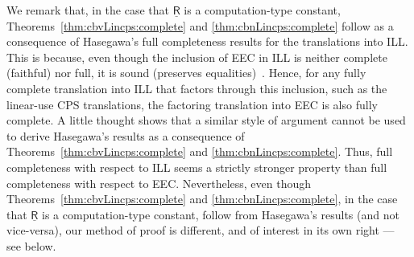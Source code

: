 \documentclass{LMCS}
\newcommand{\comptype}[1]{\underline{#1}}
\newcommand{\CR}{\comptype{\mathsf{R}}}
\begin{document}
We remark that, in the case that $\CR$ is a computation-type constant,
Theorems~\ref{thm:cbvLincps:complete} and \ref{thm:cbnLincps:complete} follow as a consequence of 
Hasegawa's full completeness results for the translations into ILL.
This is because, even though the inclusion of EEC in ILL is neither complete (faithful) nor full,
it is sound (preserves equalities)~\cite{EMSb}. Hence, for any fully complete
translation into ILL that  factors through this inclusion, such as
the linear-use CPS translations, the 
factoring translation into EEC is also fully complete. A little thought shows 
that a
similar style of argument cannot be used to derive Hasegawa's results as a consequence of 
Theorems~\ref{thm:cbvLincps:complete} and \ref{thm:cbnLincps:complete}.
Thus, full completeness with respect to ILL seems a strictly stronger property
than full completeness with respect to EEC. 
Nevertheless, even though Theorems~\ref{thm:cbvLincps:complete} and \ref{thm:cbnLincps:complete},
in the case that $\CR$ is a computation-type constant, follow from Hasegawa's results
(and not vice-versa), our method of proof is different, and of interest in its own right --- see below.
\end{document}
